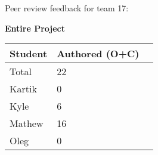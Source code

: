 \documentclass{article}
\begin{document}
Peer review feedback for team 17:

    \begin{table}[H]
        \centering
        \textbf{Entire Project}\\
        \begin{tabular}{lll}
        \toprule
        \textbf{Student} & \textbf{Authored (O+C)}\\
        \midrule
        Total & 22\\
        Kartik & 0\\
        Kyle   & 6 \\
        Mathew & 16 \\
        Oleg   & 0 \\
        
        \bottomrule
        \end{tabular}
        \end{table}
\end{document}

